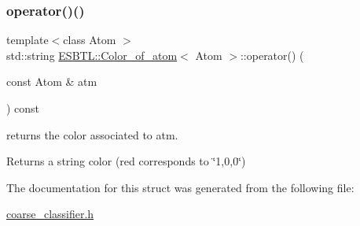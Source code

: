 \subsubsection{\texorpdfstring{operator()()}{operator()()}}
{\footnotesize\ttfamily template$<$class Atom $>$ \\
std\+::string \hyperlink{structESBTL_1_1Color__of__atom}{E\+S\+B\+T\+L\+::\+Color\+\_\+of\+\_\+atom}$<$ Atom $>$\+::operator() (\begin{DoxyParamCaption}\item[{const Atom \&}]{atm }\end{DoxyParamCaption}) const\hspace{0.3cm}{\ttfamily [inline]}}

returns the color associated to {\ttfamily atm}. \begin{DoxyReturn}{Returns}
a string color (red corresponds to \char`\"{}1,0,0\char`\"{}) 
\end{DoxyReturn}


The documentation for this struct was generated from the following file\+:\begin{DoxyCompactItemize}
\item 
\hyperlink{coarse__classifier_8h}{coarse\+\_\+classifier.\+h}\end{DoxyCompactItemize}
